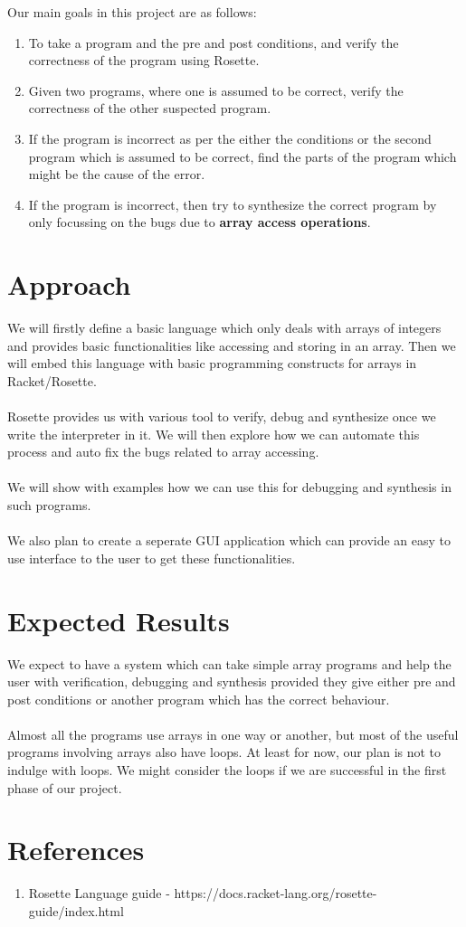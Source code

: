 \documentclass[a4paper, 12pt, notitlepage] {article}
\begin{document}
Our main goals in this project are as follows:
\begin{enumerate}
	\item To take a program and the pre and post conditions, and verify the correctness of the program using Rosette.
	\item Given two programs, where one is assumed to be correct, verify the correctness of the other suspected program.
	\item If the program is incorrect as per the either the conditions or the second program which is assumed to be correct, find the parts of the program which might be the cause of the error.
	\item If the program is incorrect, then  try to synthesize the correct program by only focussing on the bugs due to {\bf array access operations}.
\end{enumerate}

\section {Approach}
We will firstly define a basic language which only deals with arrays of integers and provides basic functionalities like accessing and storing in an array. Then we will embed this language with basic programming constructs for arrays in Racket/Rosette.\\
\\
Rosette provides us with various tool to verify, debug and synthesize once we write the interpreter in it. We will then explore how we can automate this process and auto fix the bugs related to array accessing.
\\
\\
We will show with examples how we can use this for debugging and synthesis in such programs.\\
\\
We also plan to create a seperate GUI application which can provide an easy to use interface to the user to get these functionalities. 


\section{Expected Results}
We expect to have a system which can take simple array programs and help the user with verification, debugging and synthesis provided they give either pre and post conditions or another program which has the correct behaviour.\\
\\
Almost all the programs use arrays in one way or another, but most of the useful programs involving arrays also have loops. At least for now, our plan is not to indulge with loops. We might consider the loops if we are successful in the first phase of our project. 

\section*{References}

\begin{enumerate}
	\item Rosette Language guide - https://docs.racket-lang.org/rosette-guide/index.html
\end{enumerate}
\end{document}
